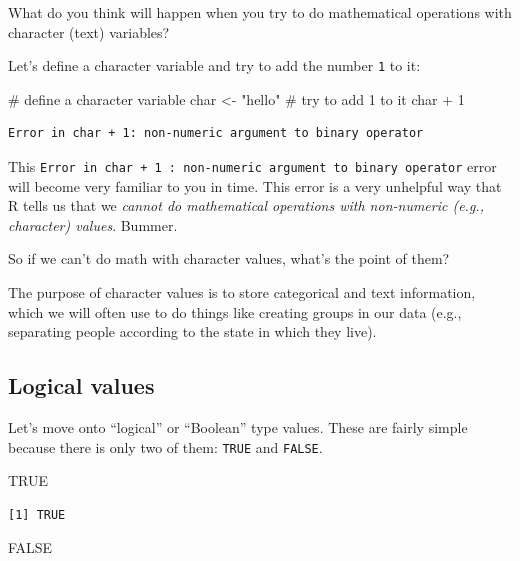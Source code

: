 \documentclass[
  letterpaper,
  DIV=11,
  numbers=noendperiod]{scrreprt}
\newenvironment{Shaded}{\begin{snugshade}}{\end{snugshade}}
\newcommand{\CommentTok}[1]{\textcolor[rgb]{0.37,0.37,0.37}{#1}}
\newcommand{\ConstantTok}[1]{\textcolor[rgb]{0.56,0.35,0.01}{#1}}
\newcommand{\DecValTok}[1]{\textcolor[rgb]{0.68,0.00,0.00}{#1}}
\newcommand{\NormalTok}[1]{\textcolor[rgb]{0.00,0.23,0.31}{#1}}
\newcommand{\OtherTok}[1]{\textcolor[rgb]{0.00,0.23,0.31}{#1}}
\newcommand{\SpecialCharTok}[1]{\textcolor[rgb]{0.37,0.37,0.37}{#1}}
\newcommand{\StringTok}[1]{\textcolor[rgb]{0.13,0.47,0.30}{#1}}
\begin{document}
What do you think will happen when you try to do mathematical operations
with character (text) variables?

Let's define a character variable and try to add the number \texttt{1}
to it:

\begin{Shaded}
\begin{Highlighting}[]
\CommentTok{\# define a character variable}
\NormalTok{char }\OtherTok{\textless{}{-}} \StringTok{"hello"}
\CommentTok{\# try to add 1 to it}
\NormalTok{char }\SpecialCharTok{+} \DecValTok{1}
\end{Highlighting}
\end{Shaded}

\begin{verbatim}
Error in char + 1: non-numeric argument to binary operator
\end{verbatim}

This
\texttt{Error\ in\ char\ +\ 1\ :\ non-numeric\ argument\ to\ binary\ operator}
error will become very familiar to you in time. This error is a very
unhelpful way that R tells us that we \emph{cannot do mathematical
operations with non-numeric (e.g., character) values}. Bummer.

So if we can't do math with character values, what's the point of them?

The purpose of character values is to store categorical and text
information, which we will often use to do things like creating groups
in our data (e.g., separating people according to the state in which
they live).

\subsection{Logical values}\label{logical-values}

Let's move onto ``logical'' or ``Boolean'' type values. These are fairly
simple because there is only two of them: \texttt{TRUE} and
\texttt{FALSE}.

\begin{Shaded}
\begin{Highlighting}[]
\ConstantTok{TRUE}
\end{Highlighting}
\end{Shaded}

\begin{verbatim}
[1] TRUE
\end{verbatim}

\begin{Shaded}
\begin{Highlighting}[]
\ConstantTok{FALSE}
\end{Highlighting}
\end{Shaded}
\end{document}
